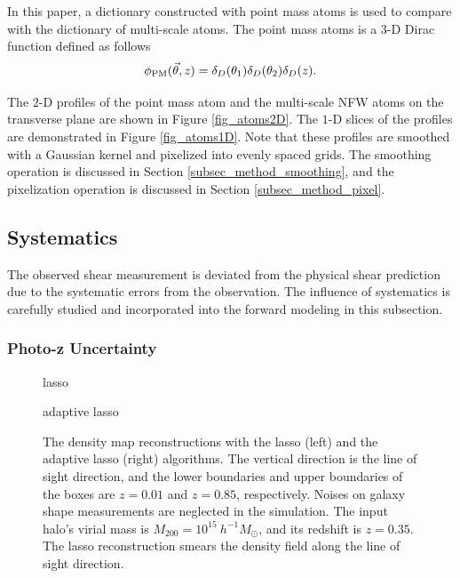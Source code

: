 In this paper, a dictionary constructed with point mass atoms is used to
compare with the dictionary of multi-scale atoms. The point mass atoms is a
$3$-D Dirac function defined as follows
\begin{equation}
\phi_{\rm{PM}}(\vec{\theta},z) = \delta_D(\theta_1) \delta_D(\theta_2) \delta_D(z).
\end{equation}

The $2$-D profiles of the point mass atom and the multi-scale NFW atoms on the
transverse plane are shown in Figure \ref{fig_atoms2D}. The $1$-D slices of the
profiles are demonstrated in Figure \ref{fig_atoms1D}. Note that these profiles
are smoothed with a Gaussian kernel and pixelized into evenly spaced grids. The
smoothing operation is discussed in Section \ref{subsec_method_smoothing}, and
the pixelization operation is discussed in Section \ref{subsec_method_pixel}.

\subsection{Systematics}
\label{subsec_method_Systematics}

The observed shear measurement is deviated from the physical shear prediction
due to the systematic errors from the observation. The influence of systematics is
carefully studied and incorporated into the forward modeling in this subsection.

\subsubsection{Photo-z Uncertainty}
\label{subsec_method_photoz}

\begin{figure}
\begin{minipage}[c]{1.0\columnwidth}
    \centering
    \small lasso
\end{minipage}
\begin{minipage}[c]{1.0\columnwidth}
    \centering
    \small adaptive lasso
\end{minipage}
\caption{The density map reconstructions with the lasso (left) and the adaptive
    lasso (right) algorithms. The vertical direction is the line of sight
    direction, and the lower boundaries and upper boundaries of the boxes are
    $z=0.01$ and $z=0.85$, respectively. Noises on galaxy shape measurements
    are neglected in the simulation.  The input halo's virial mass is
    $M_{200}=10^{15} ~h^{-1}M_{\odot}$, and its redshift is $z=0.35$. The lasso
    reconstruction smears the density field along the line of sight direction.
    } \label{fig_lassoVsadaLasso}
\end{figure}

